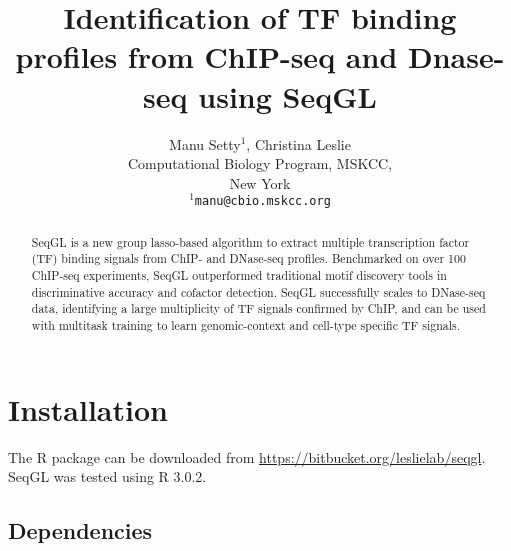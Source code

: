 \documentclass[10pt,oneside]{article}\usepackage[]{graphicx}\usepackage[]{color}
\begin{document}


\title{\bf{Identification of TF binding profiles from ChIP-seq and Dnase-seq using SeqGL}}
\author{Manu Setty$^1$, Christina Leslie\\[1em]Computational Biology Program, MSKCC,\\ New York\\
\texttt{$^1$manu@cbio.mskcc.org}}



\maketitle

\begin{abstract}
SeqGL is a new group lasso-based algorithm to extract multiple transcription factor (TF) binding signals from ChIP- and DNase-seq profiles. Benchmarked on over 100 ChIP-seq experiments, SeqGL outperformed traditional motif discovery tools in discriminative accuracy and cofactor detection. SeqGL successfully scales to DNase-seq data, identifying a large multiplicity of TF signals confirmed by ChIP, and can be used with multitask training to learn genomic-context and cell-type specific TF signals.
\end{abstract}


\tableofcontents

\section{Installation}
The R package can be downloaded from \url{https://bitbucket.org/leslielab/seqgl}. SeqGL was tested using R 3.0.2.
\subsection {Dependencies}
\end{document}
